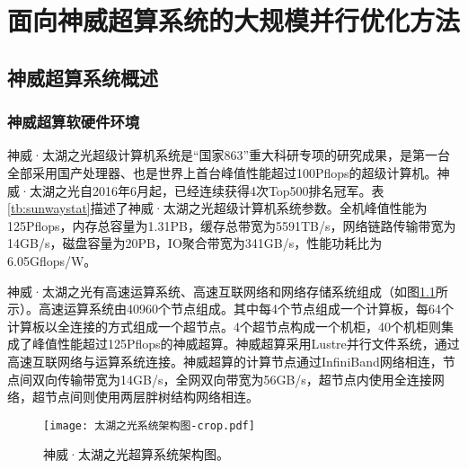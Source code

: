 \chapter{面向神威超算系统的大规模并行优化方法} %
\label{cha:面向神威超算系统的大规模并行优化方法}

\section{神威超算系统概述} %
\label{sec:神威超算系统概述}

\subsection{神威超算软硬件环境}
\label{sub:神威超算软硬件环境}
神威·太湖之光超级计算机系统是“国家863”重大科研专项的研究成果，是第一台全部采用国产处理器、也是世界上首台峰值性能超过100Pflops的超级计算机。神威·太湖之光自2016年6月起，已经连续获得4次Top500排名冠军。表\ref{tb:sunwaystat}描述了神威·太湖之光超级计算机系统参数。全机峰值性能为125Pflops，内存总容量为1.31PB，缓存总带宽为5591TB/s，网络链路传输带宽为14GB/s，磁盘容量为20PB，IO聚合带宽为341GB/s，性能功耗比为6.05Gflops/W。


\begin{table}[ht]
\centering
\caption{神威·太湖之光超级计算机系统基础参数}
\label{tb:sunwaystat}
\end{table}

神威·太湖之光有高速运算系统、高速互联网络和网络存储系统组成（如图\ref{fig:sunwayarch}所示）。高速运算系统由40960个节点组成。其中每4个节点组成一个计算板，每64个计算板以全连接的方式组成一个超节点。4个超节点构成一个机柜，40个机柜则集成了峰值性能超过125Pflops的神威超算。神威超算采用Lustre并行文件系统，通过高速互联网络与运算系统连接。神威超算的计算节点通过InfiniBand网络相连，节点间双向传输带宽为14GB/s，全网双向带宽为56GB/s，超节点内使用全连接网络，超节点间则使用两层胖树结构网络相连。

\begin{figure}[ht]
\centering
\texttt{[image: 太湖之光系统架构图-crop.pdf]}
\caption{神威·太湖之光超算系统架构图。}
\label{fig:sunwayarch}
\end{figure}


